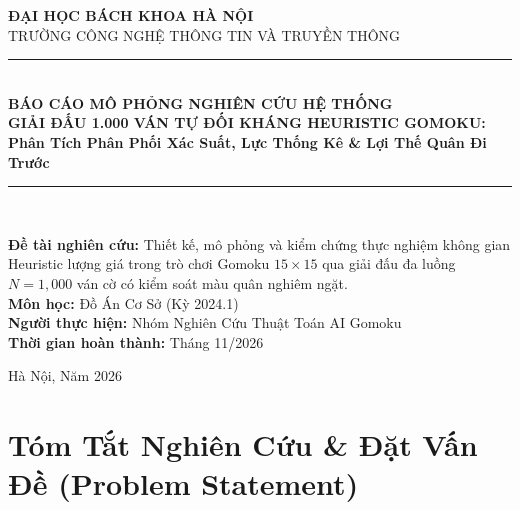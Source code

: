 \documentclass[11pt,a4paper]{article}
\begin{document}
\begin{titlepage}
\centering
\vspace*{1.0cm}
{\Large\bfseries ĐẠI HỌC BÁCH KHOA HÀ NỘI}\\[0.3cm]
{\large TRƯỜNG CÔNG NGHỆ THÔNG TIN VÀ TRUYỀN THÔNG}\\[2.0cm]

\rule{\textwidth}{1.5pt}\\[0.4cm]
{\huge\bfseries BÁO CÁO MÔ PHỎNG NGHIÊN CỨU HỆ THỐNG}\\[0.3cm]
{\LARGE\bfseries GIẢI ĐẤU 1.000 VÁN TỰ ĐỐI KHÁNG HEURISTIC GOMOKU:}\\[0.2cm]
{\Large\bfseries Phân Tích Phân Phối Xác Suất, Lực Thống Kê \& Lợi Thế Quân Đi Trước}\\[0.4cm]
\rule{\textwidth}{1.5pt}\\[1.5cm]

\begin{minipage}{0.85\textwidth}
\begin{center}
\textbf{Đề tài nghiên cứu:} Thiết kế, mô phỏng và kiểm chứng thực nghiệm không gian Heuristic lượng giá trong trò chơi Gomoku $15 \times 15$ qua giải đấu đa luồng $N = 1{,}000$ ván cờ có kiểm soát màu quân nghiêm ngặt.\\
\vspace{0.4cm}
\textbf{Môn học:} Đồ Án Cơ Sở (Kỳ 2024.1)\\
\textbf{Người thực hiện:} Nhóm Nghiên Cứu Thuật Toán AI Gomoku\\
\textbf{Thời gian hoàn thành:} Tháng 11/2026
\end{center}
\end{minipage}

\vfill
{\small Hà Nội, Năm 2026}
\end{titlepage}

\tableofcontents
\clearpage
{}

\section{Tóm Tắt Nghiên Cứu \& Đặt Vấn Đề (Problem Statement)}
\end{document}
